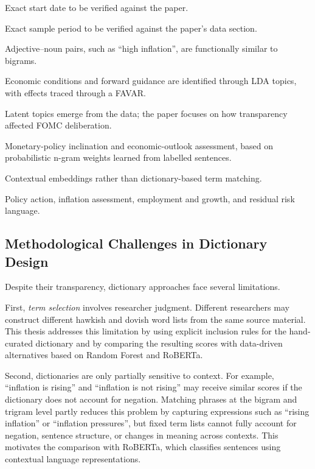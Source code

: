 \begin{table}[htbp]
\begin{threeparttable}
\begin{tabularx}{\textwidth}
\bottomrule
\end{tabularx}

\begin{tablenotes}\scriptsize
  \item[a] Exact start date to be verified against the paper.
  \item[b] Exact sample period to be verified against the paper's data section.
  \item[c] Adjective--noun pairs, such as ``high inflation'', are functionally similar to bigrams.
  \item[d] Economic conditions and forward guidance are identified through LDA topics, with effects traced through a FAVAR.
  \item[e] Latent topics emerge from the data; the paper focuses on how transparency affected FOMC deliberation.
  \item[f] Monetary-policy inclination and economic-outlook assessment, based on probabilistic n-gram weights learned from labelled sentences.
  \item[g] Contextual embeddings rather than dictionary-based term matching.
  \item[h] Policy action, inflation assessment, employment and growth, and residual risk language.
\end{tablenotes}

\end{threeparttable}
\end{table}

\subsection{Methodological Challenges in Dictionary Design}

Despite their transparency, dictionary approaches face several
limitations.

First, \emph{term selection} involves researcher judgment. Different
researchers may construct different hawkish and dovish word lists from
the same source material. This thesis addresses this limitation by using
explicit inclusion rules for the hand-curated dictionary and by
comparing the resulting scores with data-driven alternatives based on
Random Forest and RoBERTa.

Second, dictionaries are only partially sensitive to context. For
example, ``inflation is rising'' and ``inflation is not rising'' may
receive similar scores if the dictionary does not account for negation.
Matching phrases at the bigram and trigram level partly reduces this
problem by capturing expressions such as ``rising inflation'' or
``inflation pressures'', but fixed term lists cannot fully account for
negation, sentence structure, or changes in meaning across contexts.
This motivates the comparison with RoBERTa, which classifies sentences
using contextual language representations.

